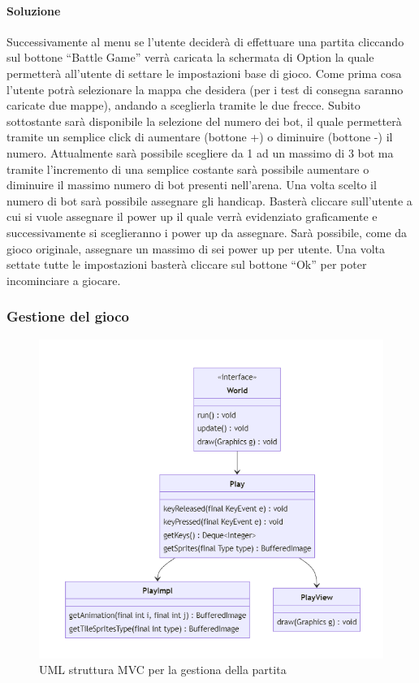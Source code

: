 \documentclass[a4paper,12pt]{report}
\begin{document}
\paragraph{Soluzione} Successivamente al menu se l’utente deciderà di effettuare una partita cliccando sul bottone “Battle Game” verrà caricata la schermata di Option la quale permetterà all’utente di settare le impostazioni base di gioco. Come prima cosa l’utente potrà selezionare la mappa che desidera (per i test di consegna saranno caricate due mappe), andando a  sceglierla tramite le due frecce. Subito sottostante sarà disponibile la selezione del numero dei bot, il quale permetterà tramite un semplice click di aumentare (bottone +) o diminuire (bottone -) il numero. Attualmente sarà possibile scegliere da 1 ad un massimo di 3 bot ma tramite l’incremento di una semplice costante sarà possibile aumentare o diminuire il massimo numero di bot presenti nell’arena. Una volta scelto il numero di bot sarà possibile assegnare gli handicap. Basterà cliccare sull'utente a cui si vuole assegnare il power up il quale verrà evidenziato graficamente e successivamente si sceglieranno i power up da assegnare. Sarà possibile, come da gioco originale, assegnare un massimo di sei power up per utente.
Una volta settate tutte le impostazioni basterà cliccare sul bottone “Ok” per poter incominciare a giocare.

\subsubsection{Gestione del gioco}

\begin{figure}[H]
    \centering{}
    \includegraphics[width=\textwidth]{img/UMLGestioneGioco.png}
    \caption{UML struttura MVC per la gestiona della partita}
\end{figure}
\end{document}
